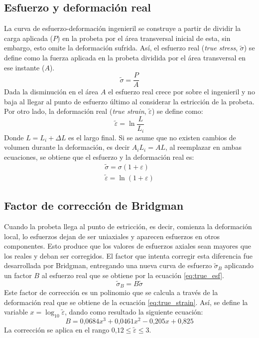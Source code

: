 \subsection{Esfuerzo y deformación real}
La curva de esfuerzo-deformación ingenieril se construye a partir de dividir la carga aplicada ($P$) en la probeta por el área transversal inicial de esta, sin embargo, esto omite la deformación sufrida. Así, el esfuerzo real (\textit{true stress}, $\tilde{\sigma}$) se define como la fuerza aplicada en la probeta dividida por el área transversal en ese instante ($A$). 
\begin{equation}
	\tilde{\sigma} = \frac{P}{A}
\end{equation} 
Dada la disminución en el área $A$ el esfuerzo real crece por sobre el ingenieril y no baja al llegar al punto de esfuerzo último al considerar la estricción de la probeta. Por otro lado, la deformación real (\textit{true strain}, $\tilde{\varepsilon}$) se define como:
\begin{equation}
	\tilde{\varepsilon} = \ln\frac{L}{L_i}
\end{equation}
Donde $L=L_i + \Delta L$ es el largo final. Si se asume que no existen cambios de volumen durante la deformación, es decir $A_iL_i = AL$,  al reemplazar en ambas ecuaciones, se obtiene que el esfuerzo y la deformación real es:
\begin{gather}
	\tilde{\sigma} = \sigma(1 + \varepsilon) \label{eq:true_esf}\\
	\tilde{\varepsilon} = \ln (1 + \varepsilon) \label{eq:true_strain}
\end{gather}

\subsection{Factor de corrección de Bridgman}
Cuando la probeta llega al punto de estricción, es decir, comienza la deformación local, lo esfuerzos dejan de ser uniaxiales y aparecen esfuerzos en otros componentes. Esto produce que los valores de esfuerzos axiales sean mayores que los reales y deban ser corregidos. El factor que intenta corregir esta diferencia fue desarrollada por Bridgman, entregando una nueva curva de esfuerzo $\tilde{\sigma}_B$ aplicando un factor $B$ al esfuerzo real que se obtiene por la ecuación \ref{eq:true_esf}. 
\begin{equation}
	\tilde{\sigma}_B = B\tilde{\sigma}
\end{equation}
Este factor de corrección es un polinomio que se calcula a través de la deformación real que se obtiene de la ecuación \ref{eq:true_strain}. Así, se define la variable $x = \log_{10} \tilde{\varepsilon}$, dando como resultado la siguiente ecuación:
\begin{equation}\label{eq:bridgman}
B = 0\text{,}0684x^3 + 0\text{,}0461x^2 - 0\text{,}205x + 0\text{,}825 
\end{equation}
La corrección se aplica en el rango $0\text{,}12 \leq \tilde{\varepsilon} \leq 3$.

